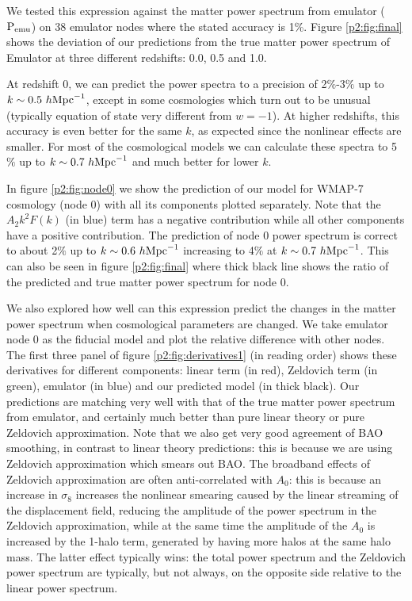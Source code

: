 \documentclass[
  11pt,
  twoside,
  openright,
  titlepage,
  headings=optiontoheadandtoc
]{scrbook}
\begin{document}
\clearpage



We tested this expression against the matter power spectrum from emulator ($\rm{P_{emu}}$) on 38 emulator nodes 
where the stated accuracy is 1\%. Figure \ref{p2:fig:final} shows the deviation of our predictions from the true  matter power spectrum of Emulator at three different redshifts: 0.0, 0.5 and 1.0. 

At redshift 0, we can predict the power spectra to a precision of 2$\%$-3$\%$ up to $k \sim 0.5\ h \rm{Mpc}^{-1}$, 
except in some cosmologies which turn out to be unusual (typically equation of state very different 
from $w=-1$). At higher redshifts, this accuracy is even better for the same $k$, as expected since the 
nonlinear effects are smaller. For most of the cosmological models we can calculate these spectra to
5$\%$ up to $k\sim 0.7\ h \rm{Mpc}^{-1}$ and much better for lower $k$.

In figure \ref{p2:fig:node0} we show the prediction of our model for WMAP-7 cosmology (node 0)
with all its components plotted separately. Note that the $A_2k^2F(k)$ (in blue) term has a negative contribution while all other components have a positive contribution. The prediction of node 0 power spectrum is correct to about 2$\%$ up to $k \sim 0.6\ h \rm{Mpc}^{-1}$ increasing to 4$\%$ at $k \sim 0.7\ h \rm{Mpc}^{-1}$. This
can also be seen in figure \ref{p2:fig:final} where thick black line shows the ratio of the predicted and true matter power spectrum for node 0.

We also explored how well can this expression predict the changes in the matter power spectrum when 
cosmological parameters are changed. We take emulator node 0 as the fiducial model and plot the relative difference with other nodes. The first three panel of figure \ref{p2:fig:derivatives1} (in reading order) shows these derivatives for different components: linear term (in red), Zeldovich term (in green), emulator (in blue) and our predicted model (in thick black). Our predictions are matching very well with that of the true matter power spectrum from emulator, and certainly much better than pure linear theory or pure Zeldovich approximation. Note that we 
also get very good agreement of BAO smoothing, in contrast to linear theory predictions: this is because we 
are using Zeldovich approximation which smears out BAO. 
The broadband effects of Zeldovich approximation are often anti-correlated with $A_0$: this is because an 
increase in $\sigma_8$ increases the nonlinear smearing caused by the linear streaming of the 
displacement field, reducing the 
amplitude of the power spectrum in the 
Zeldovich approximation, while at the same time the amplitude of the $A_0$ is increased by the 1-halo 
term, generated by having more halos at the same halo mass. 
The latter effect typically wins: the total power spectrum and the Zeldovich power spectrum are typically, 
but not always, on the opposite side relative to the linear power spectrum. 
\end{document}
